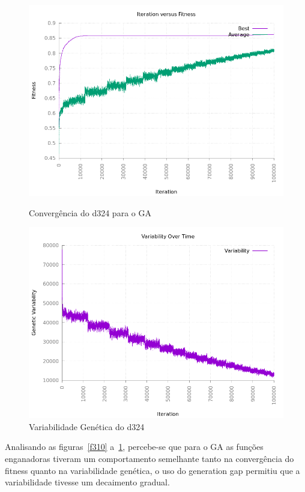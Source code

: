 \documentclass[12pt]{article}
\begin{document}
\begin{figure}[h!]
    \centering
    \begin{minipage}{0.45\textwidth}
        \centering
        \includegraphics[width=\textwidth]{pictures/d324convergence}
        \caption{Convergência do d324 para o GA}
    \end{minipage}
    \begin{minipage}{0.45\textwidth}
        \centering
        \includegraphics[width=\textwidth]{pictures/d324variability}
        \caption{Variabilidade Genética do d324}
        \label{d324}
    \end{minipage}
\end{figure}

Analisando as figuras~\ref{f310} a~\ref{d324}, percebe-se que para o GA as funções 
enganadoras tiveram um comportamento semelhante tanto na convergência do fitness 
quanto na variabilidade genética, o uso do generation gap permitiu que a variabilidade 
tivesse um decaimento gradual.
\end{document}
